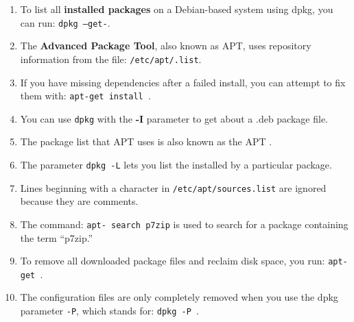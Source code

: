 \documentclass[a4paper]{report}
\begin{document}
\begin{enumerate}[1.]
\item To list all \textbf{installed packages} on a Debian-based system using dpkg, you can run:\newline
\texttt{dpkg --get-\underline{\hspace{2cm}}}.

\item The \textbf{Advanced Package Tool}, also known as APT, uses repository information from the file:\newline
\texttt{/etc/apt/\underline{\hspace{2cm}}.list}.

\item If you have missing dependencies after a failed install, you can attempt to fix them with:\newline
\texttt{apt-get install \underline{\hspace{2cm}}}.

\item You can use \texttt{dpkg} with the \textbf{-I} parameter to get \underline{\hspace{2cm}} about a .deb package file.

\item The package list that APT uses is also known as the APT \underline{\hspace{2cm}}.

\item The parameter \texttt{dpkg -L} lets you list the \underline{\hspace{2cm}} installed by a particular package.

\item Lines beginning with a \underline{\hspace{2cm}} character in \texttt{/etc/apt/sources.list} are ignored because they are comments.

\item The command:\newline
\texttt{apt-\underline{\hspace{2cm}} search p7zip}\newline
is used to search for a package containing the term “p7zip.”

\item To remove all downloaded package files and reclaim disk space, you run:\newline
\texttt{apt-get \underline{\hspace{2cm}}}.

\item The configuration files are only completely removed when you use the dpkg parameter \texttt{-P}, which stands for:\newline
\texttt{dpkg -P \underline{\hspace{2cm}}}.

\end{enumerate}
\end{document}
